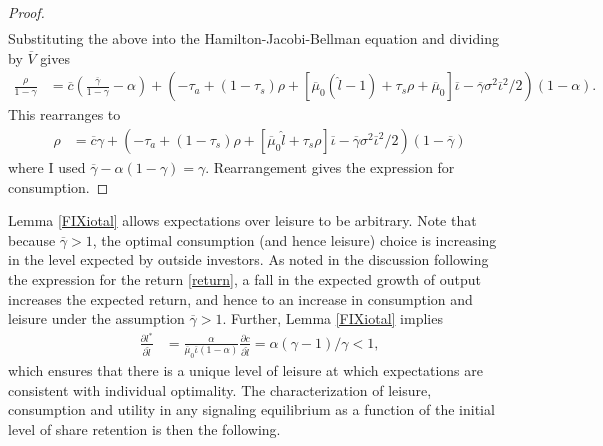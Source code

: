 \documentclass[11pt]{article}
\theoremstyle{plain}
\begin{document}
\begin{proof}
\begin{align*}
\end{align*}
Substituting the above into the Hamilton-Jacobi-Bellman equation and dividing by $\overline{V}$ gives
\begin{align*}
\frac{\rho}{1-\gamma} & = \overline{c}{\left(\frac{\overline{\gamma}}{1-\gamma} -\alpha \right)} + {\left( -\tau_a + (1-\tau_s)\rho + [\overline{\mu}_0(\hat{l} - 1) + \tau_s\rho + \overline{\mu}_0]\overline{\iota} - \overline{\gamma}\sigma^2\overline{\iota}^2/2\right)}(1-\alpha).
\end{align*}
This rearranges to
\begin{align*}
\rho & = \overline{c}\gamma + {\left( -\tau_a + (1-\tau_s)\rho + [\overline{\mu}_0\hat{l} + \tau_s\rho]\overline{\iota} - \overline{\gamma}\sigma^2\overline{\iota}^2/2\right)}(1-\overline{\gamma})
\end{align*} %
where I used $\overline{\gamma} - \alpha(1-\gamma) = \gamma$. Rearrangement gives the expression for consumption.
\end{proof}

Lemma \ref{FIXiotal} allows expectations over leisure to be arbitrary. Note that because $\overline{\gamma}>1$, the optimal consumption (and hence leisure) choice is increasing in the level expected by outside investors. As noted in the discussion following the expression for the return \eqref{return}, a fall in the expected growth of output increases the expected return, and hence to an increase in consumption and leisure under the assumption $\overline{\gamma}>1$. Further, Lemma \ref{FIXiotal} implies
\begin{align*} %
\frac{\partial l^*}{\partial \hat{l}} & = \frac{\alpha }{\overline{\mu}_0\overline{\iota}(1-\alpha)} \frac{\partial c}{\partial \hat{l}} = \alpha (\gamma-1) /\gamma < 1, 
\end{align*}
which ensures that there is a unique level of leisure at which expectations are consistent with individual optimality. The characterization of leisure, consumption and utility in any signaling equilibrium as a function of the initial level of share retention is then the following. 
\end{document}

